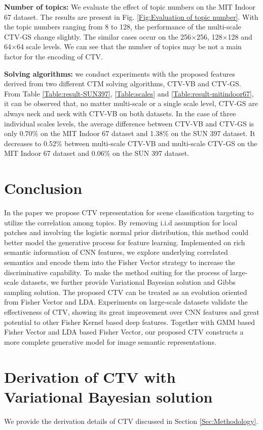 \documentclass[journal]{IEEEtran}
\begin{document}
\textbf{Number of topics:} We evaluate the effect of topic numbers on the MIT Indoor 67 dataset. The results are present in Fig. \ref{Fig:Evaluation of topic number}. With the topic numbers ranging from 8 to 128, the performance of the multi-scale CTV-GS change slightly. The similar cases occur on the 256$\times$256, 128$\times$128 and 64$\times$64 scale levels. We can see that the number of topics may be not a main factor for the encoding of CTV.

\textbf{Solving algorithms:} we conduct experiments with the proposed features derived from two different CTM solving algorithms, CTV-VB and CTV-GS. From Table \ref{Table:result-SUN397}, \ref{Table:scales} and \ref{Table:result-mitindoor67}, it can be observed that, no matter multi-scale or a single scale level, CTV-GS are always neck and neck with CTV-VB on both datasets. In the case of three individual scales levels, the average difference between CTV-VB and CTV-GS is only 0.70\% on the MIT Indoor 67 dataset and 1.38\% on the SUN 397 dataset. It decreases to 0.52\% between multi-scale CTV-VB and multi-scale CTV-GS on the MIT Indoor 67 dataset and 0.06\% on the SUN 397 dataset.
\section{Conclusion} \label{Sec:Conclusion}
In the paper we propose CTV representation for scene classification targeting to utilize the correlation among topics. By removing i.i.d assumption for local patches and involving the logistic normal prior distribution, this method could better model the generative process for feature learning. Implemented on rich semantic information of CNN features, we explore underlying correlated semantics and encode them into the Fisher Vector strategy to increase the discriminative capability. To make the method suiting for the process of large-scale datasets, we further provide Variational Bayesian solution and Gibbs sampling solution. The proposed CTV can be treated as an evolution oriented from Fisher Vector and LDA. Experiments on large-scale datasets validate the effectiveness of CTV, showing its great improvement over CNN features and great potential to other Fisher Kernel based deep features. Together with GMM based Fisher Vector and LDA based Fisher Vector, our proposed CTV constructs a more complete generative model for image semantic representations.

\appendices
\section{Derivation of CTV with Variational Bayesian solution} \label{Sec:Appendix A}
We provide the derivation details of CTV discussed in Section \ref{Sec:Methodology}.%
\end{document}
